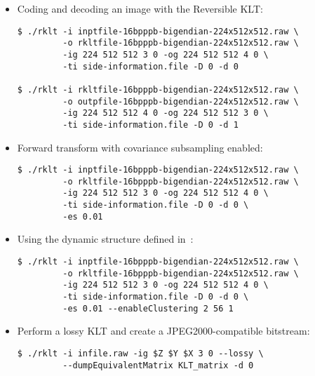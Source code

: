 \documentclass[a4paper,10pt]{article}
\begin{document}
\begin{itemize}
\item Coding and decoding an image with the Reversible KLT:
\begin{framed}%
\vspace{-1em}%
\begin{verbatim}
$ ./rklt -i inptfile-16bpppb-bigendian-224x512x512.raw \
         -o rkltfile-16bpppb-bigendian-224x512x512.raw \
         -ig 224 512 512 3 0 -og 224 512 512 4 0 \
         -ti side-information.file -D 0 -d 0

$ ./rklt -i rkltfile-16bpppb-bigendian-224x512x512.raw \ 
         -o outpfile-16bpppb-bigendian-224x512x512.raw \
         -ig 224 512 512 4 0 -og 224 512 512 3 0 \
         -ti side-information.file -D 0 -d 1 
\end{verbatim}%
\vspace{-1em}%
\end{framed}

\item Forward transform with covariance subsampling enabled:
\begin{framed}%
\vspace{-1em}%
\begin{verbatim}
$ ./rklt -i inptfile-16bpppb-bigendian-224x512x512.raw \
         -o rkltfile-16bpppb-bigendian-224x512x512.raw \
         -ig 224 512 512 3 0 -og 224 512 512 4 0 \
         -ti side-information.file -D 0 -d 0 \
         -es 0.01
\end{verbatim}%
\vspace{-1em}%
\end{framed}

\item Using the dynamic structure defined in~\cite{BS10}:
\begin{framed}%
\vspace{-1em}%
\begin{verbatim}
$ ./rklt -i inptfile-16bpppb-bigendian-224x512x512.raw \
         -o rkltfile-16bpppb-bigendian-224x512x512.raw \
         -ig 224 512 512 3 0 -og 224 512 512 4 0 \
         -ti side-information.file -D 0 -d 0 \
         -es 0.01 --enableClustering 2 56 1
\end{verbatim}%
\vspace{-1em}%
\end{framed}

\item Perform a lossy KLT and create a JPEG2000-compatible bitstream:
\begin{framed}%
\vspace{-1em}%
\begin{verbatim}
$ ./rklt -i infile.raw -ig $Z $Y $X 3 0 --lossy \
         --dumpEquivalentMatrix KLT_matrix -d 0


\end{verbatim}
\end{framed}
\end{itemize}
\end{document}
